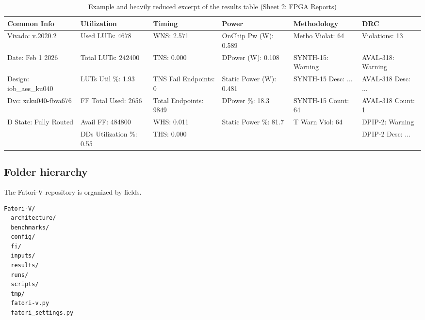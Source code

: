 \begin{table}[H]
\centering
\scriptsize
\setlength{\tabcolsep}{2pt}
\caption{Example and heavily reduced excerpt of the results table (Sheet 2: FPGA Reports)}
\renewcommand{\arraystretch}{1.15}
\begin{tabular}{p{} p{} p{} p{} p{} p{}}
\hline
Common Info & Utilization & Timing & Power & Methodology & DRC \\
\hline
Vivado: v.2020.2 &
Used LUTs: 4678 &
WNS: 2.571 &
OnChip Pw (W): 0.589 &
Metho Violat: 64 &
Violations: 13 \\

Date: Feb 1 2026 &
Total LUTs: 242400 &
TNS: 0.000 &
DPower (W): 0.108 &
SYNTH-15: Warning &
AVAL-318: Warning \\

Design: iob\_aes\_ku040 &
LUTs Util \%: 1.93 &
TNS Fail Endpoints: 0 &
Static Power (W): 0.481 &
SYNTH-15 Desc: ... &
AVAL-318 Desc: ...\\

Dvc: xcku040-fbva676 &
FF Total Used: 2656 &
Total Endpoints: 9849 &
DPower \%: 18.3 &
SYNTH-15 Count: 64 &
AVAL-318 Count: 1 \\

D State: Fully Routed &
Avail FF: 484800 &
WHS: 0.011 &
Static Power \%: 81.7 &
T Warn Viol: 64 &
DPIP-2: Warning \\

 &
DDs Utilization \%: 0.55 &
THS: 0.000 &
 &
 &
DPIP-2 Desc: ... \\

\hline
\end{tabular}
\label{tab:results_table_fpga_excerpt}
\end{table}

\subsection{Folder hierarchy}
\label{chap3:folder_hierarchy}

 The \ac{Fatori-V} repository is organized by fields.

\begin{lstlisting}[basicstyle=\ttfamily\footnotesize,caption={Fatori-V repository tree}]
Fatori-V/
  architecture/
  benchmarks/
  config/
  fi/
  inputs/
  results/
  runs/
  scripts/
  tmp/
  fatori-v.py
  fatori_settings.py
\end{lstlisting}

